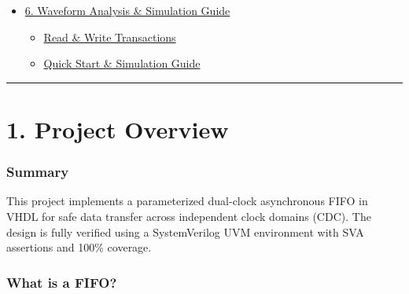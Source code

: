 \documentclass[
]{article}
\providecommand{\tightlist}{%
  \setlength{\itemsep}{0pt}\setlength{\parskip}{0pt}}
\begin{document}
\begin{itemize}
  \begin{itemize}
  \tightlist
  \item
    \hyperref[why-use-systemverilog-assertions]{Why use SystemVerilog
    Assertions?}
  \item
    \hyperref[systemverilog-assertions---13-safety-checkers]{SystemVerilog
    Assertions - 13 Safety Checkers}
  \item
    \hyperref[defense-in-depth-data-integrity]{Defense in Depth (Data
    Integrity)}
  \item
    \hyperref[functional--structural-code-coverage]{Functional \&
    Structural Code Coverage}
  \item
    \hyperref[verification-trace-matrix-features-verified]{Verification
    Trace Matrix (Features Verified)}
  \item
    \hyperref[coverage-results]{Coverage Results}
  \end{itemize}
\item
  \hyperref[6-waveform-analysis--simulation-guide]{6. Waveform Analysis
  \& Simulation Guide}

  \begin{itemize}
  \tightlist
  \item
    \hyperref[read--write-transactions]{Read \& Write Transactions}
  \item
    \hyperref[quick-start--simulation-guide]{Quick Start \& Simulation
    Guide}
  \end{itemize}
\end{itemize}

\begin{center}\rule{0.5\linewidth}{0.5pt}\end{center}

\section{1. Project Overview}\label{1-project-overview}

\subsubsection{Summary}\label{summary}

This project implements a parameterized dual-clock asynchronous FIFO in
VHDL for safe data transfer across independent clock domains (CDC). The
design is fully verified using a SystemVerilog UVM environment with SVA
assertions and 100\% coverage.

\subsubsection{What is a FIFO?}\label{what-is-a-fifo}
\end{document}
